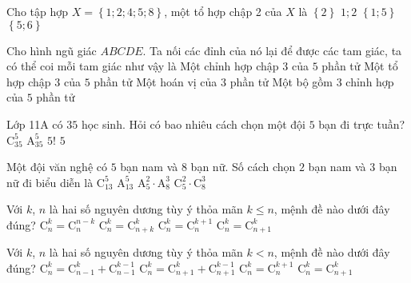\begin{ex}%
	Cho tập hợp $X=\left\{ 1;2;4;5;8 \right\}$, một tổ hợp chập 2 của $X$ là
	\choice
	{ $\left\{ 2 \right\}$}
	{ $1;2$}
	{\True $\left\{ 1;5 \right\}$}
	{ $\left\{ 5;6 \right\}$}
\end{ex}
\begin{ex}%
	Cho hình ngũ giác $ABCDE$. Ta nối các đỉnh của nó lại để được các tam giác, ta có thể coi mỗi tam giác như vậy là
	\choice
	{ Một chỉnh hợp chập $3$ của $5$ phần tử}
	{\True Một tổ hợp chập $3$ của $5$ phần tử}
	{ Một hoán vị của $3$ phần tử}
	{ Một bộ gồm $3$ chỉnh hợp của $5$ phần tử}
\end{ex}
\begin{ex}%
	Lớp 11A có $35$ học sinh. Hỏi có bao nhiêu cách chọn một đội $5$ bạn đi trực tuần?
	\choice
	{\True $\mathrm{C}_{35}^5$}
	{ $\mathrm{A}_{35}^5$}
	{ $5!$}
	{ $5$}
\end{ex}
\begin{ex}%
	Một đội văn nghệ có $5$ bạn nam và $8$ bạn nữ. Số cách chọn $2$ bạn nam và $3$ bạn nữ đi biểu diễn là
	\choice
	{ $\mathrm{C}_{13}^5$}
	{ $\mathrm{A}_{13}^5$}
	{ $\mathrm{A}_5^2\cdot\mathrm{A}_8^3$}
	{\True $\mathrm{C}_5^2\cdot\mathrm{C}_8^3$}
\end{ex}
\begin{ex}%
	Với $k$, $n$ là hai số nguyên dương tùy ý thỏa mãn $k\le n$, mệnh đề nào dưới đây đúng?
	\choice
	{\True $\mathrm{C}_n^k=\mathrm{C}_n^{n-k}$}
	{ $\mathrm{C}_n^k=\mathrm{C}_{n+k}^k$}
	{ $\mathrm{C}_n^k=\mathrm{C}_n^{k+1}$}
	{ $\mathrm{C}_n^k=\mathrm{C}_{n+1}^k$}
\end{ex}
\begin{ex}%
	Với $k$, $n$ là hai số nguyên dương tùy ý thỏa mãn $k<n$, mệnh đề nào dưới đây đúng?
	\choice
	{\True $\mathrm{C}_n^k=\mathrm{C}_{n-1}^k+\mathrm{C}_{n-1}^{k-1}$}
	{$\mathrm{C}_n^k=\mathrm{C}_{n+1}^k+\mathrm{C}_{n+1}^{k-1}$}
	{ $\mathrm{C}_n^k=\mathrm{C}_n^{k+1}$}
	{ $\mathrm{C}_n^k=\mathrm{C}_{n+1}^k$}
\end{ex}
